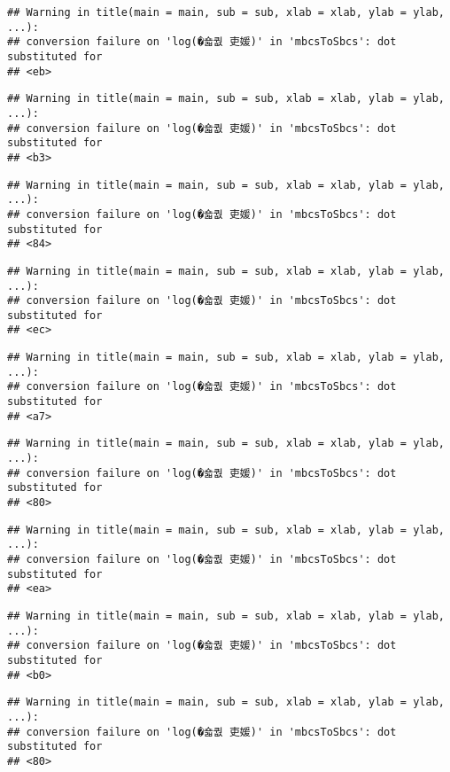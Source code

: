 \documentclass[]{article}
\begin{document}
\begin{verbatim}
## Warning in title(main = main, sub = sub, xlab = xlab, ylab = ylab, ...):
## conversion failure on 'log(�숇퀎 吏媛)' in 'mbcsToSbcs': dot substituted for
## <eb>
\end{verbatim}

\begin{verbatim}
## Warning in title(main = main, sub = sub, xlab = xlab, ylab = ylab, ...):
## conversion failure on 'log(�숇퀎 吏媛)' in 'mbcsToSbcs': dot substituted for
## <b3>
\end{verbatim}

\begin{verbatim}
## Warning in title(main = main, sub = sub, xlab = xlab, ylab = ylab, ...):
## conversion failure on 'log(�숇퀎 吏媛)' in 'mbcsToSbcs': dot substituted for
## <84>
\end{verbatim}

\begin{verbatim}
## Warning in title(main = main, sub = sub, xlab = xlab, ylab = ylab, ...):
## conversion failure on 'log(�숇퀎 吏媛)' in 'mbcsToSbcs': dot substituted for
## <ec>
\end{verbatim}

\begin{verbatim}
## Warning in title(main = main, sub = sub, xlab = xlab, ylab = ylab, ...):
## conversion failure on 'log(�숇퀎 吏媛)' in 'mbcsToSbcs': dot substituted for
## <a7>
\end{verbatim}

\begin{verbatim}
## Warning in title(main = main, sub = sub, xlab = xlab, ylab = ylab, ...):
## conversion failure on 'log(�숇퀎 吏媛)' in 'mbcsToSbcs': dot substituted for
## <80>
\end{verbatim}

\begin{verbatim}
## Warning in title(main = main, sub = sub, xlab = xlab, ylab = ylab, ...):
## conversion failure on 'log(�숇퀎 吏媛)' in 'mbcsToSbcs': dot substituted for
## <ea>
\end{verbatim}

\begin{verbatim}
## Warning in title(main = main, sub = sub, xlab = xlab, ylab = ylab, ...):
## conversion failure on 'log(�숇퀎 吏媛)' in 'mbcsToSbcs': dot substituted for
## <b0>
\end{verbatim}

\begin{verbatim}
## Warning in title(main = main, sub = sub, xlab = xlab, ylab = ylab, ...):
## conversion failure on 'log(�숇퀎 吏媛)' in 'mbcsToSbcs': dot substituted for
## <80>
\end{verbatim}
\end{document}
